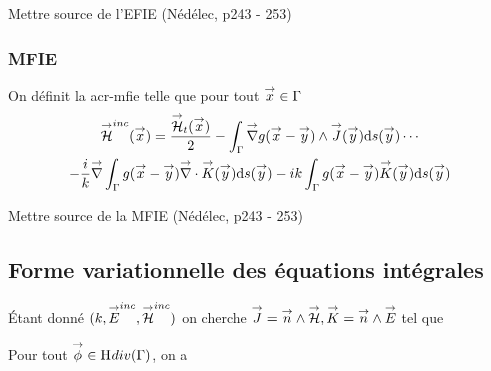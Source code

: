       \begin{REF}
        Mettre source de l'EFIE (Nédélec, p243 - 253)
      \end{REF}

    \subsubsection{MFIE}

      \begin{defn}
        On définit la \gls{acr-mfie} telle que pour tout \({\overset{\rightarrow}{x}} \in \Gamma\)
        \begin{multline}
          \label{eq:form_int:MFIE}
          \vH^{inc}(\vx) =
          \frac{\vH_t(\vx)}{2}
            - \int_\Gamma \vgrad g(\vx - \vy) \pvect \vJ(\vy) \dd{s}(\vy) \cdots \\
          - \frac{i}{k} \vgrad \int_\Gamma  g(\vx - \vy)\vdiv\vK(\vy)\dd{s}(\vy)
            - ik \int_\Gamma g(\vx - \vy)\vK(\vy)\dd{s}(\vy)
        \end{multline}
      \end{defn}
      \begin{REF}
        Mettre source de la MFIE (Nédélec, p243 - 253)
      \end{REF}

  \subsection{Forme variationnelle des équations intégrales}
    Étant donné \((k,{\overset{\rightarrow}{E}}^{inc},{\overset{\rightarrow}{\mathcal{H}}}^{inc})\) on cherche \({\overset{\rightarrow}{J}} = {\overset{\rightarrow}{n}} \wedge {\overset{\rightarrow}{\mathcal{H}}}, {\overset{\rightarrow}{K}} = {\overset{\rightarrow}{n}} \wedge {\overset{\rightarrow}{E}}\) tel que

    Pour tout \({\overset{\rightarrow}{\phi}} \in \mathrm{H}_\mathrm{{}}{div}(\Gamma)\), on a

